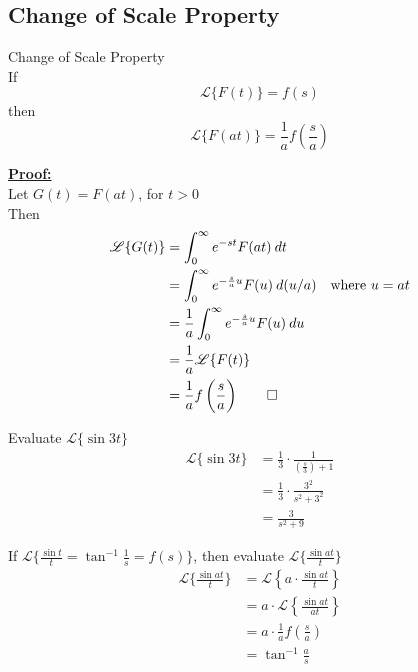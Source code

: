 \documentclass[12pt]{article}
\newcommand{\Lap}{\mathscr{L}}
\begin{document}
\subsection{Change of Scale Property}
\begin{theorem}{Change of Scale Property}{}
    \\If \[
        \Lap \{ F(t) \} = f(s)
    \] then \[
        \Lap \{ F(at) \} = \frac{1}{a} f \left( \frac{s}{a} \right)
    \]
\end{theorem}

\underline{\textbf{Proof: }} \\
Let $G(t) = F(at)$, for $t>0$\\
Then\\
\begin{align*}
    \Lap \{ G(t) \} &= \int_{0}^{\infty} {e^{-st}F(at)} \: d{t} \\
    &= \int_{0}^{\infty} {e^{-\frac{s}{a}u}F(u)} \: d{(u/a)} \quad \text{where } u=at \\
    &= \frac{1}{a} \int_{0}^{\infty} {e^{-\frac{s}{a}u}F(u)} \: d{u} \\
    &= \frac{1}{a} \Lap \{ F(t) \} \\
    &= \frac{1}{a} f \left( \frac{s}{a} \right)\qed
\end{align*}

\begin{example}{Evaluate $\Lap \{ \sin{3t} \}$}{}
    \begin{align*}
        \Lap \{ \sin{3t} \} &= \frac{1}{3} \cdot \frac{1}{\left( \frac{s}{3} \right) + 1} \\
        &= \frac{1}{3} \cdot \frac{3^2}{s^2+3^2}\\
        &= \frac{3}{s^2+9}
    \end{align*}
\end{example}

\begin{example}{If $\Lap \{ \frac{\sin{t}}{t} = \tan^{-1}{\frac{1}{s}} = f(s) \}$, then evaluate $\Lap \{ \frac{\sin{at}}{t} \}$}{}
    \begin{align*}
        \Lap \{ \frac{\sin{at}}{t} \} &= \Lap \left\{ a \cdot \frac{\sin{at}}{t} \right\} \\
        &= a \cdot \Lap \left\{ \frac{\sin{at}}{at} \right\} \\
        &= a \cdot \frac{1}{a} f\left(\frac{s}{a}\right) \\
        &= \tan^{-1}{\frac{a}{s}}
    \end{align*}
\end{example}
\end{document}
